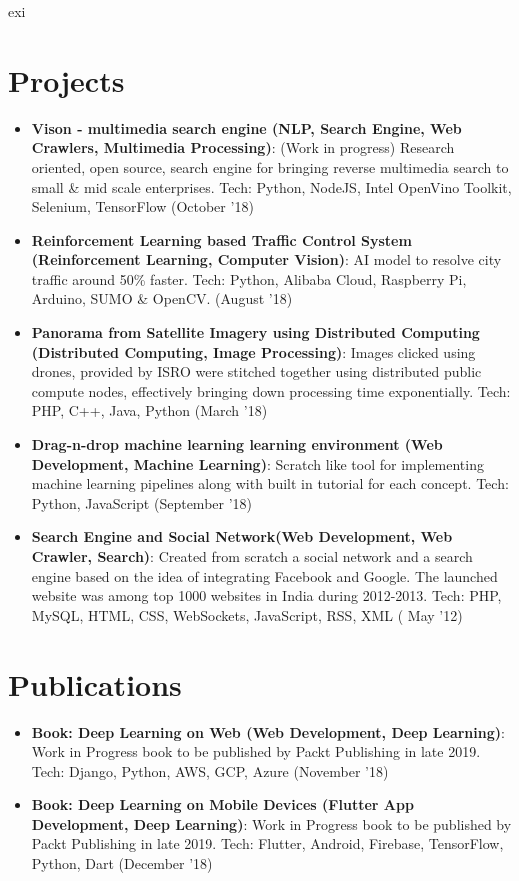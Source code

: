 exi\documentclass[a4paper,20pt]{article}
\newcommand{\resumeItem}[2]{
  \item\small{
    \textbf{#1}{: #2 \vspace{-2pt}}
  }
}
\newcommand{\resumeSubItem}[2]{\resumeItem{#1}{#2}\vspace{-3pt}}
\newcommand{\resumeSubHeadingListStart}{\begin{itemize}[leftmargin=*]}
\newcommand{\resumeSubHeadingListEnd}{\end{itemize}}
\begin{document}
\section{Projects}
\resumeSubHeadingListStart
\resumeSubItem{Vison - multimedia search engine (NLP, Search Engine, Web Crawlers, Multimedia Processing)}{(Work in progress) Research oriented, open source, search engine for bringing reverse multimedia search to small \& mid scale enterprises. Tech: Python, NodeJS, Intel OpenVino Toolkit, Selenium, TensorFlow (October '18)}
\vspace{2pt}
\resumeSubItem{Reinforcement Learning based Traffic Control System (Reinforcement Learning, Computer Vision)}{AI model to resolve city traffic around 50\%
faster. Tech: Python, Alibaba Cloud, Raspberry Pi, Arduino, SUMO \& OpenCV. (August '18)}
\vspace{2pt}
\resumeSubItem{Panorama from Satellite Imagery using Distributed Computing (Distributed Computing, Image Processing)}{Images clicked using drones, provided by ISRO were stitched together using distributed public compute nodes, effectively bringing down processing time exponentially. Tech: PHP, C++, Java, Python (March '18)}
\vspace{2pt}
\resumeSubItem{Drag-n-drop machine learning learning environment (Web Development, Machine Learning)}{Scratch like tool for implementing machine learning pipelines along with built in tutorial for each concept. Tech: Python, JavaScript (September '18)}
\vspace{2pt}
\resumeSubItem{Search Engine and Social Network(Web Development, Web Crawler, Search)}{Created from scratch a social network and a search engine based on the idea of integrating Facebook and Google. The launched website was among top 1000 websites in India during 2012-2013. Tech: PHP, MySQL, HTML, CSS, WebSockets, JavaScript, RSS, XML ( May '12)}
\resumeSubHeadingListEnd
\vspace{-5pt}
\section{Publications}
\resumeSubHeadingListStart
\resumeSubItem{Book: Deep Learning on Web (Web Development, Deep Learning)}{Work in Progress book to be published by Packt Publishing in late 2019. Tech: Django, Python, AWS, GCP, Azure (November '18)}
\vspace{2pt}
\resumeSubItem{Book: Deep Learning on Mobile Devices (Flutter App Development, Deep Learning)}{Work in Progress book to be published by Packt Publishing in late 2019. Tech: Flutter, Android, Firebase, TensorFlow, Python, Dart (December '18)}
\resumeSubHeadingListEnd
\vspace{-5pt}
\end{document}
